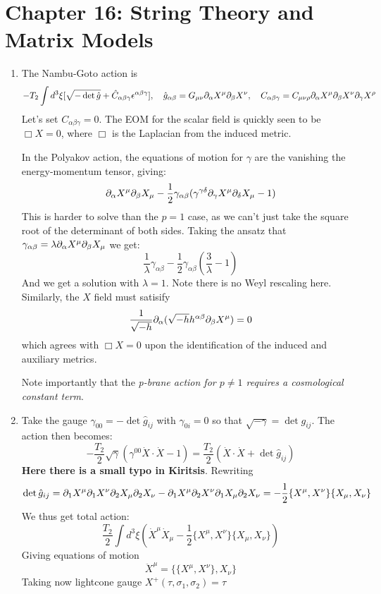 \documentclass[11pt, class=article, crop=false]{standalone}
\begin{document}
\section{Chapter 16: String Theory and Matrix Models} %
\label{sec:chapter_16_string_theory_and_matrix_models}

\begin{enumerate}
	\item The Nambu-Goto action is
	\[
		-T_2 \int d^3 \xi [\sqrt{-\det \hat g} + \hat C_{\alpha \beta \gamma} \epsilon^{\alpha \beta \gamma}], \quad \hat g_{\alpha \beta} = G_{\mu \nu} \partial_\alpha X^\mu \partial_\beta X^\nu, \quad C_{\alpha \beta \gamma} = C_{\mu \nu \rho} \partial_\alpha X^\mu \partial_\beta X^\nu \partial_\gamma X^\rho
	\]
	 Let's set $C_{\alpha \beta \gamma} = 0$. The EOM for the scalar field is quickly seen to be $\Box X = 0$, where $\Box$ is the Laplacian from the induced metric. 
	 
	 In the Polyakov action, the equations of motion for $\gamma$ are the vanishing the energy-momentum tensor, giving:
	 \[
	 	\partial_\alpha X^\mu \partial_\beta X_\mu - \frac12 \gamma_{\alpha \beta} ( \gamma^{\gamma \delta} \partial_\gamma X^\mu \partial_\delta X_\mu - 1)
	 \]
	 This is harder to solve than the $p=1$ case, as we can't just take the square root of the determinant of both sides. Taking the ansatz that $\gamma_{\alpha \beta} = \lambda \partial_\alpha X^\mu \partial_\beta X_\mu$ we get:
	 \[
	 	\frac{1}{\lambda} \gamma_{\alpha \beta} - \frac12 \gamma_{\alpha \beta}\left(\frac{3}{\lambda} - 1 \right)
	 \]
	 And we get a solution with $\lambda = 1$. Note there is no Weyl rescaling here. Similarly, the $X$ field must satisify
	 \[
	 	\frac{1}{\sqrt{-h}} \partial_\alpha (\sqrt{-h} h^{\alpha \beta} \partial_\beta X^\mu) = 0
	 \]
	 which agrees with $\Box X = 0$ upon the identification of the induced and auxiliary metrics. 
	
	
	Note importantly that the \emph{p-brane action for $p\neq 1$ requires a cosmological constant term}.
	
	\item Take the gauge $\gamma_{00} = -\det \hat g_{ij}$ with $\gamma_{0i} = 0$ so that $\sqrt{-\gamma} = \det g_{ij}$. The action then becomes:
	\[
		-\frac{T_2}{2}  \sqrt{\gamma} \left(\gamma^{00} \dot X \cdot \dot X - 1 \right) = \frac{T_2}{2} ( \dot X \cdot \dot X  + \det \hat g_{ij})
	\]
	\textbf{Here there is a small typo in Kiritsis}. Rewriting 
	\[
		\det \hat g_{ij} = \partial_1 X^\mu \partial_1 X^\nu \partial_2 X_\mu \partial_2 X_\nu - \partial_1 X^\mu \partial_2 X^\nu \partial_1 X_\mu \partial_2 X_\nu = - \frac12 \{X^\mu, X^\nu\} \{X_{\mu}, X_{\nu}\}
	\]
	We thus get total action:
	\[
		\frac{T_2}{2} \int d^3 \xi \left(\dot X^\mu \dot X_\mu - \frac12 \{X^\mu, X^\nu\} \{X_{\mu}, X_{\nu}\} \right)
	\]
	Giving equations of motion 
	\[
		\ddot X^\mu = \{ \{X^\mu, X^\nu \}, X_\nu \}
	\]
	Taking now lightcone gauge $X^+(\tau, \sigma_1, \sigma_2) = \tau$
	

\end{enumerate}
\end{document}
